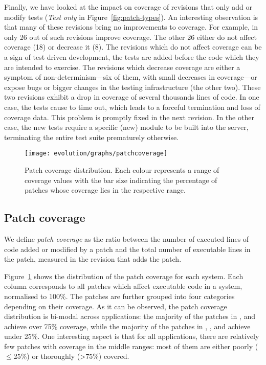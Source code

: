 Finally, we have looked at the impact on coverage of revisions that
only add or modify tests (\textit{Test only} in
Figure~\ref{fig:patch-types}).  An interesting observation is that
many of these revisions bring no improvements to coverage. For
example, in \lighttpdtwo only 26 out of \lighttpdtwoOnlyTestRevs such
revisions improve coverage. The other 26 either do not affect coverage
(18) or decrease it (8).  The revisions which do not affect coverage
can be a sign of test driven development, \ie the tests are added
before the code which they are intended to exercise. The revisions
which decrease coverage are either a symptom of non-determinism---six
of them, with small decreases in coverage---or expose bugs or bigger
changes in the testing infrastructure (the other two).  These two
revisions exhibit a drop in coverage of several thousands lines of
code. In one case, the tests cause \lighttpdtwo to time out, which leads
to a forceful termination and loss of coverage data.  This problem is
promptly fixed in the next revision.  In the other case, the new tests
require a specific (new) module to be built into the server,
terminating the entire test suite prematurely otherwise.

\begin{figure}[t]
\texttt{[image: evolution/graphs/patchcoverage]}
\caption{Patch coverage distribution. Each colour represents a range of
coverage values with the bar size indicating the percentage of patches whose
coverage lies in the respective range.}
\label{fig:patch-coverage}
\end{figure}

\subsection{Patch coverage}
\label{sec:pcoverage}
\label{sec:lpcoverage}


We define {\em patch coverage} as the ratio between the number of
executed lines of code added or modified by a patch and the total
number of executable lines in the patch, measured in the revision that
adds the patch.

Figure~\ref{fig:patch-coverage} shows the distribution of the patch coverage for each
system. Each column corresponds to all patches which affect executable
code in a system, normalised to 100\%. The patches are further grouped into
four categories depending on their coverage.
As it can be observed, the patch coverage distribution is
bi-modal across applications: the majority of the patches
in \git, \memcached and \zeromq achieve over 75\% coverage, while the
majority of the patches in \beanstalkd, \binutils, \lighttpdtwo and \redis achieve
under 25\%.  One interesting aspect is that for all applications,
there are relatively few patches with coverage in the middle ranges:
most of them are either poorly ($\le$25\%) or thoroughly (\textgreater75\%)
covered.

